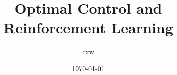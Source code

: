 \documentclass{ctexart}
\title{Optimal Control and Reinforcement Learning}
\author{cxw}
\date{\today}
\begin{document}
\maketitle

\tableofcontents

\pagebreak












\appendix


\pagebreak
\end{document}
